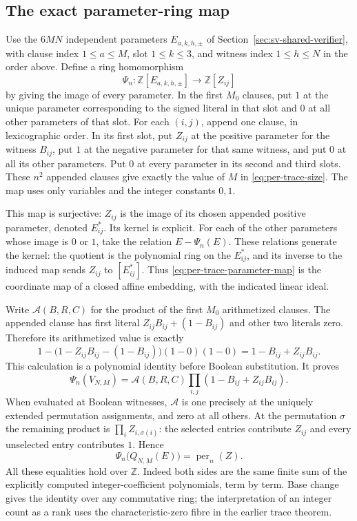 \subsection{The exact parameter-ring map}

Use the $6MN$ independent parameters $E_{a,k,h,\pm}$ of
Section~\ref{sec:sv-shared-verifier}, with clause index $1\le a\le M$,
slot $1\le k\le3$, and witness index $1\le h\le N$ in the order above.
Define a ring homomorphism
\begin{equation}\label{eq:per-trace-parameter-map}
 \Psi_n:\mathbb Z[E_{a,k,h,\pm}]
       \longrightarrow\mathbb Z[Z_{ij}]
\end{equation}
by giving the image of every parameter. In the first $M_0$ clauses,
put $1$ at the unique parameter corresponding to the signed literal
in that slot and $0$ at all other parameters of that slot. For each
$(i,j)$, append one clause, in lexicographic order. In its first slot,
put $Z_{ij}$ at the positive parameter for the witness $B_{ij}$,
put $1$ at the negative parameter for that same witness, and put $0$
at all its other parameters. Put $0$ at every parameter in its
second and third slots. These $n^2$ appended clauses give exactly
the value of $M$ in \eqref{eq:per-trace-size}. The map uses only
variables and the integer constants $0,1$.

This map is surjective: $Z_{ij}$ is the image of its chosen appended
positive parameter, denoted $E^*_{ij}$. Its kernel is explicit.
For each of the other parameters whose image is $0$ or $1$, take
the relation $E-\Psi_n(E)$. These relations generate the kernel:
the quotient is the polynomial ring on the $E^*_{ij}$, and its
inverse to the induced map sends $Z_{ij}$ to $[E^*_{ij}]$.
Thus \eqref{eq:per-trace-parameter-map} is the coordinate map of a
closed affine embedding, with the indicated linear ideal.

Write $\mathcal A(B,R,C)$ for the product of the first $M_0$
arithmetized clauses. The appended clause has first literal
$Z_{ij}B_{ij}+(1-B_{ij})$ and other two literals zero. Therefore
its arithmetized value is exactly
\[
 1-\bigl(1-Z_{ij}B_{ij}-(1-B_{ij})\bigr)(1-0)(1-0)
       =1-B_{ij}+Z_{ij}B_{ij}.
\]
This calculation is a polynomial identity before Boolean substitution.
It proves
\[
 \Psi_n(V_{N,M})=
 \mathcal A(B,R,C)\prod_{i,j}(1-B_{ij}+Z_{ij}B_{ij}).
\]
When evaluated at Boolean witnesses, $\mathcal A$ is one precisely
at the uniquely extended permutation assignments, and zero at all
others. At the permutation $\sigma$ the remaining product is
$\prod_i Z_{i,\sigma(i)}$: the selected entries contribute $Z_{ij}$
and every unselected entry contributes $1$. Hence
\begin{equation}\label{eq:per-trace-projection}
 \Psi_n\bigl(Q_{N,M}(E)\bigr)=\operatorname{per}_n(Z).
\end{equation}
All these equalities hold over $\mathbb Z$. Indeed both sides are
the same finite sum of the explicitly computed integer-coefficient
polynomials, term by term. Base change gives the identity over any
commutative ring; the interpretation of an integer count as a rank
uses the characteristic-zero fibre in the earlier trace theorem.

